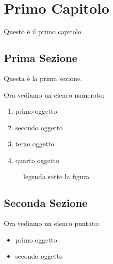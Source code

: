 \documentclass[12pt,a4paper,openright,twoside]{report}
\begin{document}
\chapter{Primo Capitolo}                %
\lhead[\fancyplain{}{\bfseries\thepage}]{\fancyplain{}{\bfseries\rightmark}}
Questo \`e il primo capitolo.
\section{Prima Sezione}                 %
Questa \`e la prima sezione.

Ora vediamo un elenco numerato:         %
\begin{enumerate}
\item primo oggetto
\item secondo oggetto
\item terzo oggetto
\item quarto oggetto
\end{enumerate}

\begin{figure}[h]                       %
\begin{center}                          %
%
\caption[legenda elenco figure]{legenda sotto la figura}\label{fig:prima}
\end{center}
\end{figure}

\section{Seconda Sezione}
Ora vediamo un elenco puntato:
\begin{itemize}                         %
\item primo oggetto
\item secondo oggetto
\end{itemize}
\end{document}
